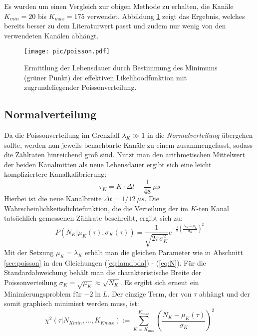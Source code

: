 		Es wurden um einen Vergleich zur obigen Methode zu erhalten, die Kanäle $K_{min} = 20$ bis $K_{max} = 175$ verwendet. Abbildung \ref{fig:LDpoisson} zeigt das Ergebnis, welches bereits besser zu dem Literaturwert passt und zudem nur wenig von den verwendeten Kanälen abhängt.
		\begin{figure}[ht]
		      			\centering
		      			\captionsetup{justification=centering}
		      			\texttt{[image: pic/poisson.pdf]}
		      			\caption{Ermittlung der Lebensdauer durch Bestimmung des Minimums (grüner Punkt) der effektiven Likelihoodfunktion mit zugrundeliegender Poissonverteilung.}
		      			\label{fig:LDpoisson}
		\end{figure}
   \subsection{Normalverteilung}	
   Da die Poissonverteilung im Grenzfall $\lambda_K \gg 1$ in die \textit{Normalverteilung} übergehen sollte, werden nun jeweils benachbarte Kanäle zu einem zusammengefasst, sodass die Zählraten hinreichend groß sind. Nutzt man den arithmetischen Mittelwert der beiden Kanalmitten als neue Lebensdauer ergibt sich eine leicht kompliziertere Kanalkalibrierung:
   		\begin{equation}
   				\tau_K = K \cdot \Delta t - \frac{1}{48}\ \unit{\mu s}	
   		\end{equation} 
   Hierbei ist die neue Kanalbreite $\Delta t = 1/12\ \unit{\mu s}$. Die Wahrscheinlichkeitsdichtefunktion, die die Verteilung der im $K$-ten Kanal tatsächlich gemessenen Zählrate beschreibt, ergibt sich zu:
   		\begin{equation}
      			P(N_K|\mu_K(\tau),\sigma_K(\tau)) = \frac{1}{\sqrt{2\pi\sigma_K^2}}e^{-\frac{1}{2}\left(\frac{N_K- \mu_K}{\sigma_K}\right)^2}	
      	\end{equation} 
    Mit der Setzung $\mu_K = \lambda_K$ erhält man die gleichen Parameter wie in Abschnitt \ref{sec:poisson} in den Gleichungen (\ref{eq:lamdbda}) - (\ref{eq:N}). Für die Standardabweichung behält man die charakteristische Breite der Poissonverteilung $\sigma_K = \sqrt{\mu_K} \approx\sqrt{N_K}$.
    Es ergibt sich erneut ein Minimierungsproblem für $-2\ln L$. Der einzige Term, der von $\tau$ abhängt und der somit graphisch minimiert werden muss, ist:
    	\begin{equation}
          	\chi^2(\tau|N_{Kmin},\dots,K_{Kmax}) := \sum_{K = K_{min}}^{K_{max}} \left(\frac{N_K - \mu_K(\tau)}{\sigma_K}\right)^2	
         \end{equation}
